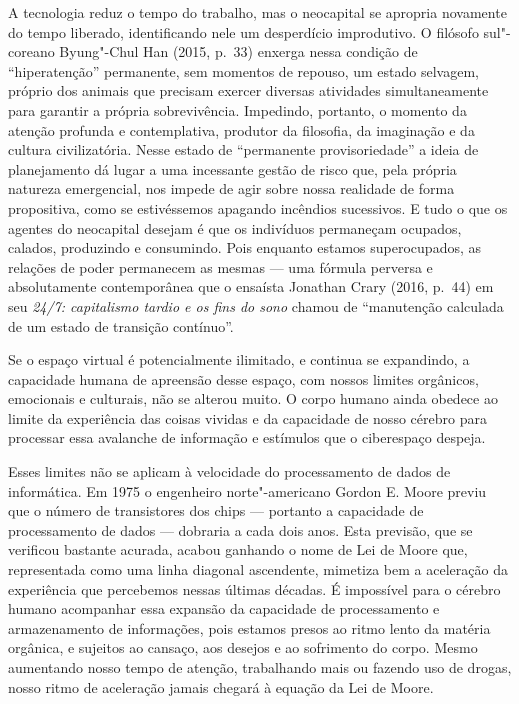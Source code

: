 A tecnologia reduz o tempo do trabalho, mas o neocapital se apropria
novamente do tempo liberado, identificando nele um desperdício
improdutivo. O filósofo sul"-coreano Byung"-Chul Han (2015, p.~33) enxerga
nessa condição de ``hiperatenção'' permanente, sem momentos de repouso,
um estado selvagem, próprio dos animais que precisam exercer diversas
atividades simultaneamente para garantir a própria sobrevivência.
Impedindo, portanto, o momento da atenção profunda e contemplativa,
produtor da filosofia, da imaginação e da cultura civilizatória. Nesse estado de
``permanente provisoriedade'' a ideia de planejamento dá lugar a uma
incessante gestão de risco que, pela própria natureza emergencial, nos
impede de agir sobre nossa realidade de forma propositiva, como se
estivéssemos apagando incêndios sucessivos. E tudo o que os agentes do
neocapital desejam é que os indivíduos permaneçam ocupados, calados,
produzindo e consumindo. Pois enquanto estamos superocupados, as
relações de poder permanecem as mesmas --- uma fórmula perversa e
absolutamente contemporânea que o ensaísta Jonathan Crary (2016, p.~44)
em seu \emph{24/7: capitalismo tardio e os fins do sono} chamou de
``manutenção calculada de um estado de transição contínuo''.

Se o espaço virtual é potencialmente ilimitado, e continua se
expandindo, a capacidade humana de apreensão desse espaço, com nossos
limites orgânicos, emocionais e culturais, não se alterou muito. O corpo
humano ainda obedece ao limite da experiência das coisas vividas e da
capacidade de nosso cérebro para processar essa avalanche de informação
e estímulos que o ciberespaço despeja.

Esses limites não se aplicam à velocidade do processamento de dados de
informática. Em 1975 o engenheiro norte"-americano Gordon E. Moore previu
que o número de transistores dos chips --- portanto a capacidade de
processamento de dados --- dobraria a cada dois anos. Esta previsão, que
se verificou bastante acurada, acabou ganhando o nome de Lei de Moore que, representada como uma linha diagonal ascendente, mimetiza bem a aceleração da experiência que percebemos nessas últimas décadas. É
impossível para o cérebro humano acompanhar essa expansão da capacidade de
processamento e armazenamento de informações, pois estamos presos ao
ritmo lento da matéria orgânica, e sujeitos ao cansaço, aos desejos e ao
sofrimento do corpo. Mesmo aumentando nosso tempo de atenção, trabalhando mais ou
fazendo uso de drogas, nosso ritmo de aceleração jamais chegará à
equação da Lei de Moore.

